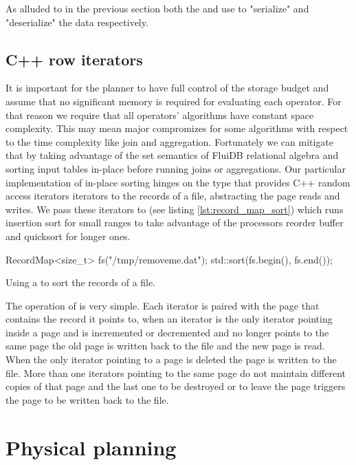 As alluded to in the previous section both the  and 
use  to "serialize" and "deserialize" the data
respectively.

\subsection{C++ row iterators}

It is important for the planner to have full control of the storage
budget and assume that no significant memory is required for
evaluating each operator. For that reason we require that all
operators' algorithms have constant space complexity. This may mean
major compromizes for some algorithms with respect to the time
complexity like join and aggregation. Fortunately we can mitigate that
by taking advantage of the set semantics of FluiDB relational algebra
and sorting input tables in-place before running joins or
aggregations. Our particular implementation of in-place sorting hinges
on the  type that provides C++ random access iterators
iterators to the records of a file, abstracting the page reads and
writes. We pass these iterators to  (see listing
\ref{lst:record_map_sort}) which runs insertion sort for small ranges
to take advantage of the processors reorder buffer and quicksort for
longer ones.

\begin{code}
\begin{cppcode}
RecordMap<size_t> fs("/tmp/removeme.dat");
std::sort(fs.begin(), fs.end());
\end{cppcode}
  \caption{\label{lst:record_map_sort}Using a  to sort
    the records of a file.}
\end{code}

The operation of  is very simple. Each iterator is paired
with the page that contains the record it points to, when an iterator
is the only iterator pointing inside a page and is incremented or
decremented and no longer points to the same page the old page is
written back to the file and the new page is read. When the only
iterator pointing to a page is deleted the page is written to the
file. More than one iterators pointing to the same page do not
maintain different copies of that page and the last one to be
destroyed or to leave the page triggers the page to be written back to
the file.
\section{Physical planning}

